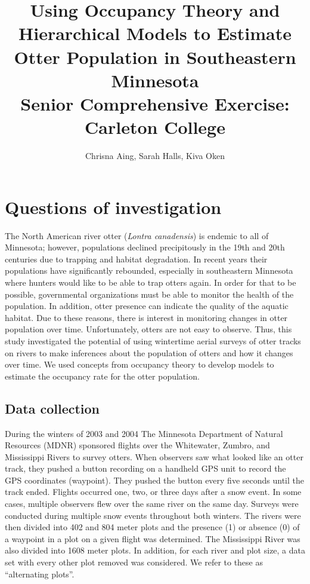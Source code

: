 \documentclass[12pt]{article}
\begin{document}
\title{Using Occupancy Theory and Hierarchical Models to Estimate Otter
Population in Southeastern Minnesota \\
{\large Senior Comprehensive Exercise: Carleton College}}
\author{Chrisna Aing, Sarah Halls, Kiva Oken}
\maketitle

\section{Questions of investigation}
The North American river otter (\textit{Lontra canadensis}) is endemic to all of
Minnesota; however, populations declined precipitously in the 19th and 20th
centuries due to trapping and habitat degradation. In recent years their
populations have significantly rebounded, especially in southeastern Minnesota
where hunters would like to be able to trap otters again. In order for that to
be possible, governmental organizations must be able to monitor the health of
the population.
In addition, otter presence can indicate the quality of the aquatic habitat.
Due to these reasons, there is interest in monitoring changes in otter
population
over time. Unfortunately, otters are not easy to observe. Thus, this study
investigated the potential of using wintertime aerial surveys of otter tracks on
rivers to make inferences about the population of otters and how it changes over
time. We used concepts from occupancy theory to develop models to estimate
the occupancy rate for the otter population.

    \subsection{Data collection}
    During the winters of 2003 and 2004 The Minnesota Department of Natural 
    Resources (MDNR) sponsored flights over the Whitewater, Zumbro,
    and Mississippi Rivers to survey otters. When observers saw what looked like 
    an otter track, they
    pushed a button recording on a handheld GPS unit to record the GPS 
    coordinates (waypoint). They pushed the button every
    five seconds until the track ended. Flights occurred one, two, or three days
    after a snow event. In some cases, multiple observers flew over the same
    river on the same day. Surveys were conducted during multiple snow events
    throughout both winters. The rivers were then divided into 402 and 804 meter
    plots and the presence (1) or absence (0) of a waypoint in a plot on a given
    flight was determined. The Mississippi River was also divided into 1608
    meter plots.  In addition, for each river and plot size, a data set with 
    every other
    plot removed was considered.  We refer to these as ``alternating plots''.
\end{document}
